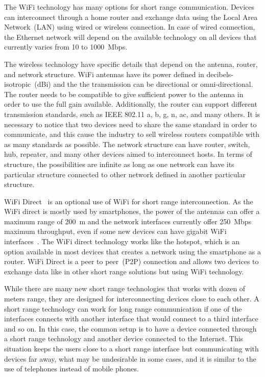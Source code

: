 The WiFi technology has many options for short range communication.
Devices can interconnect through a home router and exchange data using the Local Area Network~(LAN) using wired or wireless connection.
In case of wired connection, the Ethernet network will depend on the available technology on all devices that currently varies from 10 to 1000~Mbps.

The wireless technology have specific details that depend on the antenna, router, and network structure.
WiFi antennas have its power defined in decibels-isotropic~(dBi) and the the transmission can be directional or omni-directional.
The router needs to be compatible to give sufficient power to the antenna in order to use the full gain available.
Additionally, the router can support different transmission standards, such as IEEE 802.11 a, b, g, n, ac, and many others.
It is necessary to notice that two devices need to share the same standard in order to communicate, and this cause the industry to sell wireless routers compatible with as many standards as possible.
The network structure can have router, switch, hub, repeater, and many other devices aimed to interconnect hosts.
In terms of structure, the possibilities are infinite as long as one network can have its particular structure connected to other network defined in another particular structure.

WiFi Direct~\citep{Alliance2010wifii} is an optional use of WiFi for short range interconnection.
As the WiFi direct is mostly used by smartphones, the power of the antennas can offer a maximum range of 200~m and the network interfaces currently offer 250~Mbps maximum throughput, even if some new devices can have gigabit WiFi interfaces~\citep{Feng2014d2d}.
The WiFi direct technology works like the hotspot, which is an option available in most devices that creates a network using the smartphone as a router.
WiFi Direct is a peer to peer~(P2P) connection and allows two devices to exchange data like in other short range solutions but using WiFi technology.

While there are many new short range technologies that works with dozen of meters range, they are designed for interconnecting devices close to each other.
A short range technology can work for long range communication if one of the interfaces connects with another interface that would connect to a third interface and so on.
In this case, the common setup is to have a device connected through a short range technology and another device connected to the Internet.
This situation keeps the users close to a short range interface but communicating with devices far away, what may be undesirable in some cases, and it is similar to the use of telephones instead of mobile phones. 

